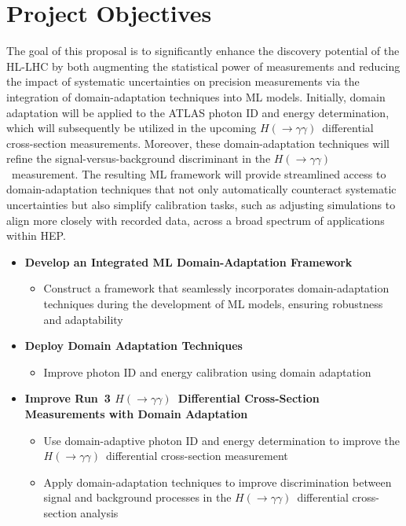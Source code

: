 \documentclass[letter, USenglish, 11pt, subfigure]{article}
\newcommand{\hyy}{\ensuremath{H(\to\gamma\gamma)}}
\begin{document}
\section{Project Objectives}

The goal of this proposal is to significantly enhance the discovery potential of the HL-LHC by both augmenting the statistical power of measurements and reducing the impact of systematic uncertainties on precision measurements via the integration of domain-adaptation techniques into ML models. Initially, domain adaptation will be applied to the ATLAS photon ID and energy determination, which will subsequently be utilized in the upcoming \hyy\ differential cross-section measurements. Moreover, these domain-adaptation techniques will refine the signal-versus-background discriminant in the \hyy\ measurement. The resulting ML framework will provide streamlined access to domain-adaptation techniques that not only automatically counteract systematic uncertainties but also simplify calibration tasks, such as adjusting simulations to align more closely with recorded data, across a broad spectrum of applications within HEP.

\begin{itemize}  
\item \textbf{Develop an Integrated ML Domain-Adaptation Framework}
  \begin{itemize}
  \item Construct a framework that seamlessly incorporates domain-adaptation techniques during the development of ML models, ensuring robustness and adaptability
  \end{itemize}

\item \textbf{Deploy Domain Adaptation Techniques}
  \begin{itemize}
  \item Improve photon ID and energy calibration using domain adaptation
  \end{itemize}
  
\item \textbf{Improve Run~3 \hyy\ Differential Cross-Section Measurements with Domain Adaptation}
  \begin{itemize}
  \item Use domain-adaptive photon ID and energy determination to improve the \hyy\ differential cross-section measurement
  \item Apply domain-adaptation techniques to improve discrimination between signal and background processes in the \hyy\ differential cross-section analysis
  \end{itemize}
\end{itemize}
\end{document}
